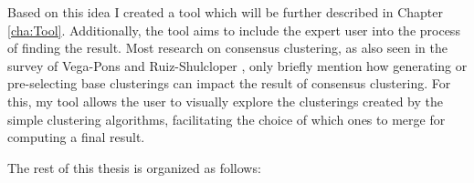 Based on this idea I created a tool which will be further described in Chapter \ref{cha:Tool}. Additionally, the tool aims to include the expert user into the process of finding the result. Most research on consensus clustering, as also seen in the survey of Vega-Pons and Ruiz-Shulcloper \cite{survey1}, only briefly mention how generating or pre-selecting base clusterings can impact the result of consensus clustering. For this, my tool allows the user to visually explore the clusterings created by the simple clustering algorithms, facilitating the choice of which ones to merge for computing a final result.

The rest of this thesis is organized as follows:

